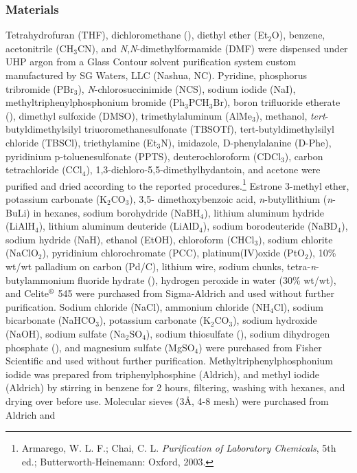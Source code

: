 \subsubsection{Materials}
Tetrahydrofuran (THF), dichloromethane (), diethyl ether (Et$_2$O), benzene,
acetonitrile (CH$_3$CN), and \textit{N},\textit{N}-dimethylformamide (DMF) were dispensed under UHP
argon from a Glass Contour solvent purification system custom manufactured by SG Waters, LLC
(Nashua, NC). Pyridine, phosphorus tribromide (PBr$_3$), \textit{N}-chlorosuccinimide (NCS), sodium
iodide (NaI), methyltriphenylphosphonium bromide (Ph$_3$PCH$_3$Br), boron trifluoride etherate
(), dimethyl sulfoxide (DMSO), trimethylaluminum (AlMe$_3$), methanol,
\textit{tert}-butyldimethylsilyl triuoromethanesulfonate (TBSOTf), tert-butyldimethylsilyl chloride
(TBSCl), triethylamine (Et$_3$N), imidazole, D-phenylalanine (D-Phe), pyridinium p-toluenesulfonate
(PPTS), deuterochloroform (CDCl$_3$), carbon tetrachloride (CCl$_4$), 1,3-dichloro-5,5-dimethylhydantoin, and acetone
were purified and dried according to the reported procedures.\footnote{{\frenchspacing Armarego, W. L. F.; Chai, C. L. \textit{Purification of
Laboratory Chemicals}, 5th ed.; Butterworth-Heinemann: Oxford, 2003.}} Estrone 3-methyl ether,
potassium carbonate (K$_2$CO$_3$), 3,5- dimethoxybenzoic acid, \textit{n}-butyllithium (\textit{n}-BuLi) in hexanes, sodium borohydride
(NaBH$_4$), lithium aluminum hydride (LiAlH$_4$), lithium aluminum deuteride (LiAlD$_4$), sodium
borodeuteride (NaBD$_4$),
sodium hydride (NaH), ethanol (EtOH), chloroform (CHCl$_3$), sodium chlorite
(NaClO$_2$), pyridinium chlorochromate (PCC), platinum(IV)oxide (PtO$_2$), 10\% wt/wt palladium on
carbon (Pd/C), lithium wire, sodium chunks, tetra-\textit{n}-butylammonium fluoride
hydrate (), hydrogen peroxide in water (30\% wt/wt), and
Celite$\textsuperscript{\textregistered}$ 545 were purchased from Sigma-Aldrich and used without further purification. Sodium
chloride (NaCl), ammonium chloride (NH$_4$Cl), sodium bicarbonate (NaHCO$_3$), potassium
carbonate (K$_2$CO$_3$), sodium hydroxide (NaOH), sodium sulfate (Na$_2$SO$_4$), sodium thiosulfate
(), sodium dihydrogen phosphate (), and magnesium sulfate (MgSO$_4$) were
purchased from Fisher Scientific and used without further purification.
Methyltriphenylphosphonium iodide was prepared from triphenylphosphine (Aldrich), and
methyl iodide (Aldrich) by stirring in benzene for 2 hours, filtering, washing with hexanes, and
drying over  before use. Molecular sieves (3\AA, 4-8 mesh) were purchased from Aldrich and
